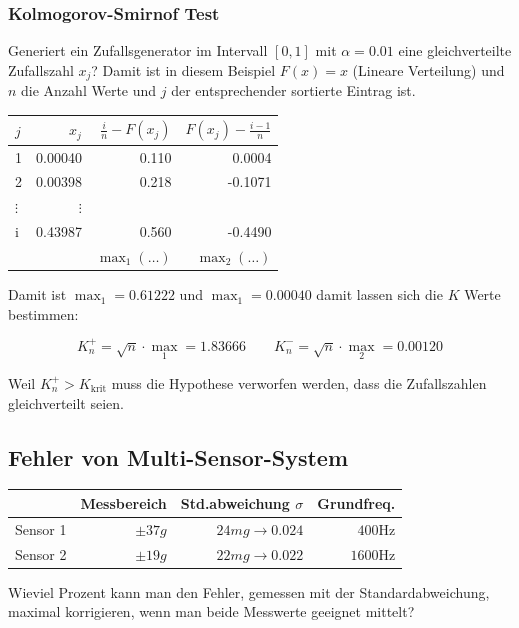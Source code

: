 \subsubsection{Kolmogorov-Smirnof Test}\label{Kolmogorov}
Generiert ein Zufallsgenerator im Intervall $[0, 1]$ mit $\alpha=0.01$ eine gleichverteilte Zufallszahl $x_j$? Damit ist in diesem Beispiel $F(x) = x$ (Lineare Verteilung) und $n$ die Anzahl Werte und $j$ der entsprechender sortierte Eintrag ist.
\begin{center}
	\begin{tabular}{l|r|r|r}
		$j$ & $x_j$ & $\frac{i}{n}-F(x_j)$ & $F(x_j) - \frac{i-1}{n}$ \\ \toprule
		1 & 0.00040 & 0.110 & 0.0004  \\  \midrule
		2& 0.00398 & 0.218 & -0.1071 \\  \midrule
		$\vdots$ & $\vdots$& &  \\  \midrule
		i & 0.43987 & 0.560 &-0.4490 \\ \bottomrule
		& & $\max_1(\dots)$ & $\max_2(\dots)$
	\end{tabular}
\end{center}

Damit ist $\max_1 = 0.61222$ und  $\max_1 = 0.00040$ damit lassen sich die $K$ Werte bestimmen:

\[
K_n^+ = \sqrt{n}\cdot \max_1 = 1.83666 \qquad K_n^- = \sqrt{n}\cdot \max_2 = 0.00120
\]

Weil $K_n^+ > K_\text{krit}$ muss die Hypothese verworfen werden, dass die Zufallszahlen gleichverteilt seien.


\subsection{Fehler von Multi-Sensor-System}
\begin{center}
	\begin{tabular}{l|r|r|r}
		& Messbereich & Std.abweichung $\sigma$ & Grundfreq. \\ \toprule
		Sensor 1 & $\pm37g$ & $24mg \rightarrow 0.024$ & $400$Hz  \\  \midrule
		Sensor 2 & $\pm19g$ & $22mg \rightarrow 0.022$ & $1600$Hz \\  \midrule
	\end{tabular}
\end{center}
Wieviel Prozent kann man den Fehler, gemessen mit der Standardabweichung, maximal korrigieren, wenn man beide Messwerte geeignet mittelt?

